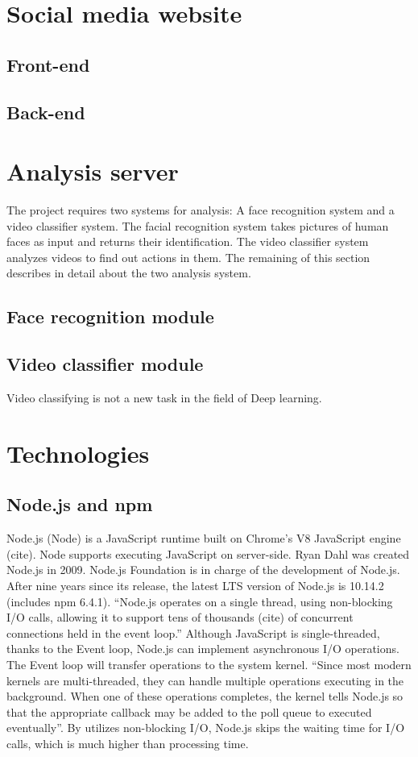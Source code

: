 \section{Social media website}
\subsection{Front-end}
\subsection{Back-end}
\section{Analysis server}
The project requires two systems for analysis: A face recognition system and a video classifier system. The facial recognition system takes pictures of human faces as input and returns their identification. The video classifier system analyzes videos to find out actions in them. The remaining of this section describes in detail about the two analysis system.
\subsection{Face recognition module}
\subsection{Video classifier module}
Video classifying is not a new task in the field of Deep learning.
	
\section{Technologies}
\subsection{Node.js and npm}
Node.js (Node) is a JavaScript runtime built on Chrome's V8 JavaScript engine (cite). Node supports executing JavaScript on server-side. Ryan Dahl was created Node.js in 2009. Node.js Foundation is in charge of the development of Node.js. After nine years since its release, the latest LTS version of Node.js is 10.14.2 (includes npm 6.4.1). “Node.js operates on a single thread, using non-blocking I/O calls, allowing it to support tens of thousands (cite) of concurrent connections held in the event loop.” Although JavaScript is single-threaded, thanks to the Event loop, Node.js can implement asynchronous I/O operations. The Event loop will transfer operations to the system kernel. “Since most modern kernels are multi-threaded, they can handle multiple operations executing in the background. When one of these operations completes, the kernel tells Node.js so that the appropriate callback may be added to the poll queue to executed eventually”. By utilizes non-blocking I/O, Node.js skips the waiting time for I/O calls, which is much higher than processing time.
